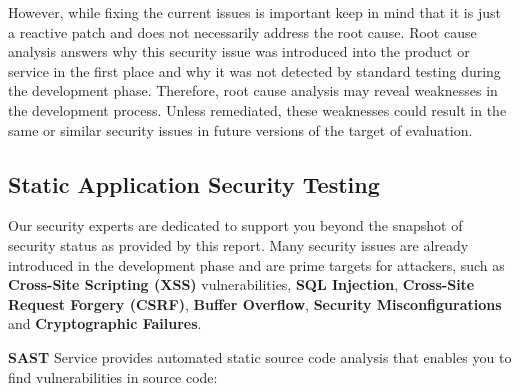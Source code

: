 However, while fixing the current issues is important keep in mind that it is just a reactive patch and does not necessarily address the root cause. Root cause analysis answers why this security issue was introduced into the product or service in the first place and why it was not detected by standard testing during the development phase. Therefore, root cause analysis may reveal weaknesses in the development process. Unless remediated, these weaknesses could result in the same or similar security issues in future versions of the target of evaluation.

\subsection{Static Application Security Testing}
\label{subsection:SAST}

Our security experts are dedicated to support you beyond the snapshot of security status as provided by this report. 
Many security issues are already introduced in the development phase and are prime targets for attackers, 
such as \textbf{Cross-Site Scripting (XSS)} vulnerabilities, \textbf{SQL Injection}, \textbf{Cross-Site Request Forgery (CSRF)}, \textbf{Buffer Overflow}, 
\textbf{Security Misconfigurations} and \textbf{Cryptographic Failures}.


\textbf{SAST} Service provides automated static source code analysis that enables you
to find vulnerabilities in source code:

